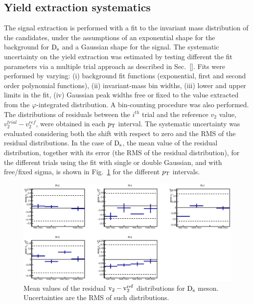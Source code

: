 \subsection{Yield extraction systematics}
\label{sec:rawYv2}
The signal extraction is performed with a fit to the invariant mass
distribution of the candidates, under the assumptions of an
exponential shape for the background for ${\rm D_s}$ and a
Gaussian shape for the signal.  
The systematic uncertainty on the yield extraction was 
estimated by testing different the fit parameters via a multiple trial approach as
described in Sec.~\ref{}. Fits were performed by varying: (i) background fit functions
(exponential, first and second order polynomial functions), (ii) invariant-mass bin
widths, (iii) lower and upper limits in the fit, (iv) Gaussian peak widths free or fixed to the value
extracted from the $\varphi$-integrated distribution. A bin-counting procedure
was also performed. The distributions of
residuals between the $i^{th}$ trial and the reference $v_2$ value, 
$v_2^{trial}-v_2^{ref}$, were obtained in each $p_{\rm T}$ interval. 
The systematic uncertainty was evaluated
considering both the shift with respect to zero and the RMS of the residual
distributions. In the case of ${\rm D_s}$, the mean value of the residual distribution, 
 together with its error (the RMS of the residual distribution), for 
 the different trials using the fit with single or double Gaussian, 
 and with free/fixed sigma, is shown in Fig.~\ref{fig:Dsv2residuals} 
 for the different $p_{\rm T}$ intervals.

\begin{figure}
 \centering
 \includegraphics[width=.9\textwidth]{FigCap5/resultsComparison_sFixToMC_ExpoLin.eps}
 \caption{Mean values of the residual $\rm v_2-\rm v_2^{ref}$ distributions for ${\rm D_s}$
   meson. Uncertainties are the RMS of such distributions.}\label{fig:Dsv2residuals}
\end{figure} 


